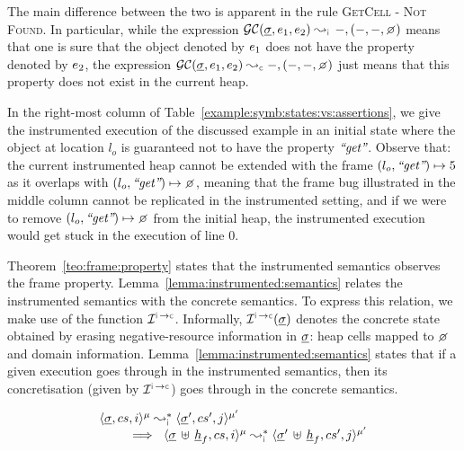  The main difference between the two is apparent in the rule \textsc{GetCell - Not Found}. 
In particular, while the expression $\absgetcellrule{\instrumented}{\istate, \jsilexpr_1, \jsilexpr_2}{-, (-, -, \none)}$ 
means that one is sure that the object denoted by $e_1$ does not have the property 
denoted by $e_2$, the expression $\absgetcellrule{\concrete}{\istate, \jsilexpr_1, \jsilexpr_2}{-, (-, -, \none)}$ 
just means that this property does not exist in the current heap. 
 
 In the right-most column of Table~\ref{example:symb:states:vs:assertions}, we give the instrumented 
 execution of the discussed example in an initial state where 
 the object at location $l_o$ is guaranteed not to have the property $\text{{\it ``get''}}$. 
 Observe that:  the current instrumented heap cannot be extended  with 
 the frame $(l_o, \text{{\it ``get''}}) \mapsto 5$ as it overlaps with $(\loc_o, \litstring{get}) \mapsto \none$, meaning 
 that the frame bug illustrated in the middle column cannot be replicated in the instrumented setting,  
 and  if we were to remove $(\loc_o, \litstring{get}) \mapsto \none$ from the initial heap, 
 the instrumented execution would get stuck in the execution of line $0$. 


Theorem~\ref{teo:frame:property} states that the \jsil instrumented semantics observes the 
frame property. Lemma~\ref{lemma:instrumented:semantics} relates the instrumented 
semantics with the concrete semantics. To express this relation, we make 
use of the function  $\interpret{\instconc}{}$. Informally,   $\interpret{\instconc}{}(\istate)$
denotes the concrete state obtained by erasing negative-resource information in $\underline{\sigma}$: 
heap cells mapped to $\none$ and domain information. 
Lemma~\ref{lemma:instrumented:semantics} states that if a given execution 
goes through in the instrumented semantics, then its concretisation (given by $\interpret{\instconc}{}$) 
goes through in the concrete semantics. 

\begin{theorem}\label{teo:frame:property}
$$
\begin{array}{l}
\transabssemrule{\istate, \cs, i}{\istate', \cs', j}{\mode}{\mode'}{\instrumented} \\ \quad \quad
       \ \implies \ 
        \transabssemrule{\istate \dunion \iheap_f, \cs, i}{\istate' \dunion \iheap_f, \cs', j}{\mode}{\mode'}{\instrumented} 
\end{array}
$$
\end{theorem}

